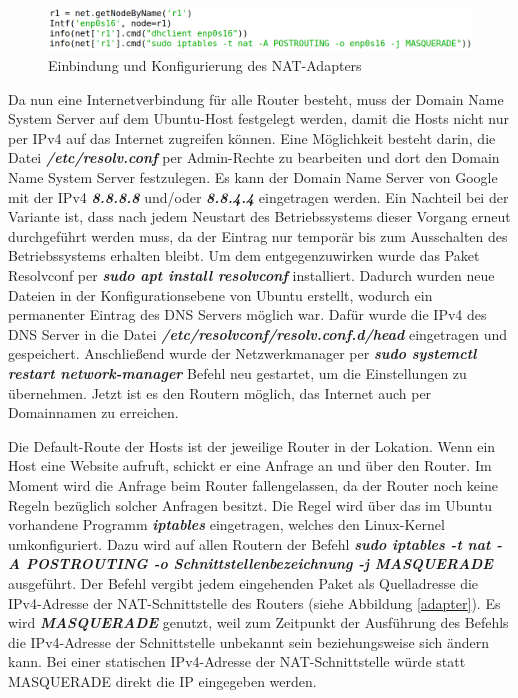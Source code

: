 \documentclass[fontsize=12pt,paper=a4,open=any,parskip=half,
  twoside=false,toc=listof,toc=bibliography,fleqn,leqno,
  captions=nooneline,captions=tableabove,british]{scrbook}
\begin{document}
\begin{figure}[H]
 \centering
 \includegraphics[width=1.0\textwidth]{Bilder/interface}
 \captionsetup{justification=centering,margin=2cm}
 \caption{Einbindung und Konfigurierung des NAT-Adapters}
 \label{interface}
\end{figure}

Da nun eine Internetverbindung für alle Router besteht, muss der Domain Name System Server auf dem Ubuntu-Host festgelegt werden, damit die Hosts nicht nur per IPv4 auf das Internet zugreifen können. Eine Möglichkeit besteht darin, die Datei \textit{\textbf{/etc/resolv.conf}} per Admin-Rechte zu bearbeiten und dort den Domain Name System Server festzulegen. Es kann der Domain Name Server von Google mit der IPv4 \textit{\textbf{8.8.8.8}} und/oder \textit{\textbf{8.8.4.4}} eingetragen werden. Ein Nachteil bei der Variante ist, dass nach jedem Neustart des Betriebssystems dieser Vorgang erneut durchgeführt werden muss, da der Eintrag nur temporär bis zum Ausschalten des Betriebssystems erhalten bleibt. Um dem entgegenzuwirken wurde das Paket Resolvconf per \textit{\textbf{sudo apt install resolvconf}} installiert. Dadurch wurden neue Dateien in der Konfigurationsebene von Ubuntu erstellt, wodurch ein permanenter Eintrag des DNS Servers möglich war. Dafür wurde die IPv4 des DNS Server in die Datei \textit{\textbf{/etc/resolvconf/resolv.conf.d/head}} eingetragen und gespeichert. Anschließend wurde der Netzwerkmanager per \textit{\textbf{sudo systemctl restart network-manager}} Befehl neu gestartet, um die Einstellungen zu übernehmen. Jetzt ist es den Routern möglich, das Internet auch per Domainnamen zu erreichen.

Die Default-Route der Hosts ist der jeweilige Router in der Lokation. Wenn ein Host eine Website aufruft, schickt er eine Anfrage an und über den Router. Im Moment wird die Anfrage beim Router fallengelassen, da der Router noch keine Regeln bezüglich solcher Anfragen besitzt. Die Regel wird über das im Ubuntu vorhandene Programm \textit{\textbf{iptables}} eingetragen, welches den Linux-Kernel umkonfiguriert. Dazu wird auf allen Routern der Befehl \textit{\textbf{sudo iptables -t nat -A POSTROUTING -o Schnittstellenbezeichnung -j MASQUERADE}} ausgeführt. Der Befehl vergibt jedem eingehenden Paket als Quelladresse die IPv4-Adresse der NAT-Schnittstelle des Routers (siehe Abbildung \ref{adapter}). Es wird \textit{\textbf{MASQUERADE}} genutzt, weil zum Zeitpunkt der Ausführung des Befehls die IPv4-Adresse der Schnittstelle unbekannt sein beziehungsweise sich ändern kann. Bei einer statischen IPv4-Adresse der NAT-Schnittstelle würde statt MASQUERADE direkt die IP eingegeben werden.
\end{document}
